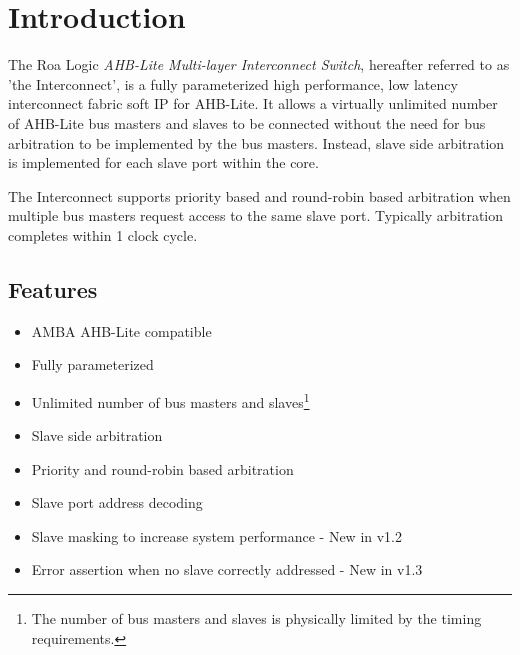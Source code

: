 \chapter{Introduction}\label{introduction}

The Roa Logic \emph{AHB-Lite Multi-layer Interconnect Switch}, hereafter referred to as 'the Interconnect', is a fully parameterized high performance, low latency interconnect fabric soft IP for AHB-Lite.
It allows a virtually unlimited number of AHB-Lite bus masters and
slaves to be connected without the need for bus arbitration to be
implemented by the bus masters. Instead, slave side arbitration is
implemented for each slave port within the core.

The Interconnect supports priority based and round-robin based
arbitration when multiple bus masters request access to the same slave
port. Typically arbitration completes within 1 clock cycle.

\section{Features}\label{features}

\begin{itemize}
\item
  AMBA AHB-Lite compatible
\item
  Fully parameterized
\item
  Unlimited number of bus masters and slaves\footnote{The number of bus
    masters and slaves is physically limited by the timing requirements.}
\item
  Slave side arbitration
\item
  Priority and round-robin based arbitration
\item
  Slave port address decoding
\item
  Slave masking to increase system performance - New in v1.2
\item
  Error assertion when no slave correctly addressed - New in v1.3
\end{itemize}
